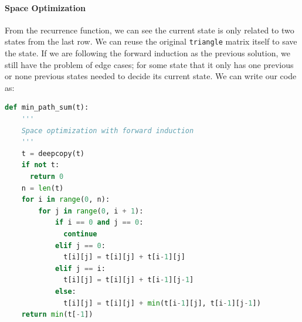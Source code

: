 \documentclass[../main.tex]{subfiles}
\begin{document}





\paragraph{Space Optimization} From the recurrence function, we can see the current state is only related to two states from the last row. We can reuse the original \texttt{triangle} matrix itself to save the state. If we are following the forward induction as the previous solution, we still have the problem of edge cases; for some state that it only has one previous or none previous states needed to decide its current state. We can write our code as: 
\begin{lstlisting}[language=Python]
def min_path_sum(t):
    '''
    Space optimization with forward induction
    '''
    t = deepcopy(t)
    if not t:
      return 0
    n = len(t)
    for i in range(0, n):
        for j in range(0, i + 1):
            if i == 0 and j == 0:
              continue
            elif j == 0:
              t[i][j] = t[i][j] + t[i-1][j]
            elif j == i:
              t[i][j] = t[i][j] + t[i-1][j-1]
            else:
              t[i][j] = t[i][j] + min(t[i-1][j], t[i-1][j-1])
    return min(t[-1])
\end{lstlisting}
\end{document}
